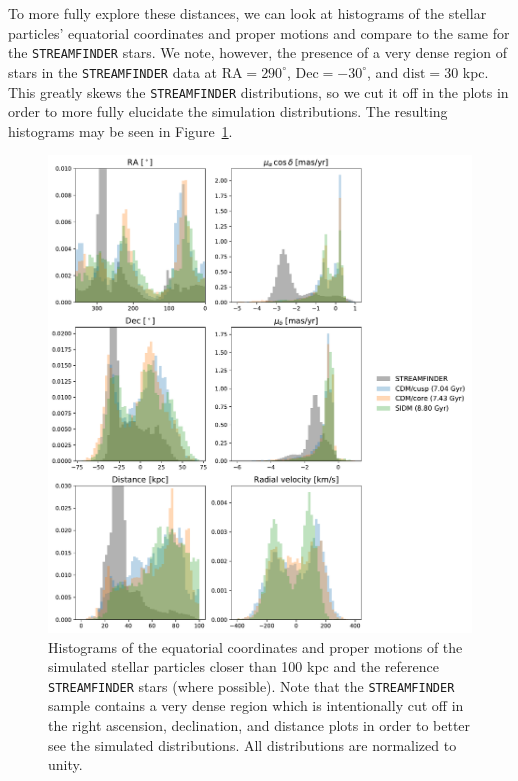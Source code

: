 To more fully explore these distances, we can look at histograms of the stellar
particles' equatorial coordinates and proper motions and compare to the same for
the \verb|STREAMFINDER| stars. We note, however, the presence of a very dense
region of stars in the \verb|STREAMFINDER| data at $\text{RA} = 290^\circ$,
$\text{Dec} = -30^\circ$, and $\text{dist} = 30$ kpc. This greatly skews the
\verb|STREAMFINDER| distributions, so we cut it off in the plots in order to
more fully elucidate the simulation distributions. The resulting histograms may
be seen in Figure~\ref{fig:eq_hists}.

\begin{figure}
    \centering
    \includegraphics[width=0.9\linewidth]{figs/equatorial_hists.pdf}
    \caption{%
        Histograms of the equatorial coordinates and proper motions of the
        simulated stellar particles closer than 100 kpc and the reference
        \texttt{STREAMFINDER} stars (where possible).  Note that the
        \texttt{STREAMFINDER} sample contains a very dense region which is
        intentionally cut off in the right ascension, declination, and
        distance plots in order to better see the simulated distributions.
        All distributions are normalized to unity.
    }
    \label{fig:eq_hists}
\end{figure}

